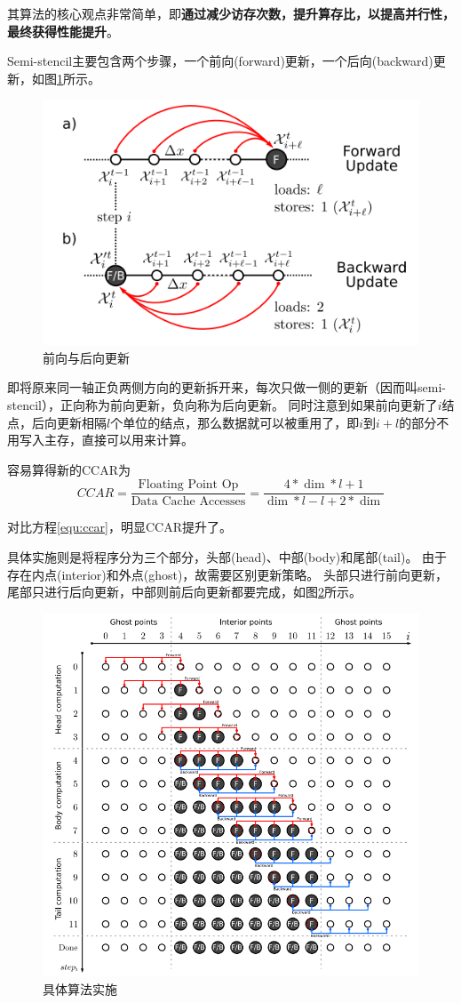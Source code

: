 \documentclass[reportComp,bib]{thesis}
\begin{document}
其算法的核心观点非常简单，即\textbf{通过减少访存次数，提升算存比，以提高并行性，最终获得性能提升}。

Semi-stencil主要包含两个步骤，一个前向(forward)更新，一个后向(backward)更新，如图\ref{fig:forward-backward}所示。
\begin{figure}[H]
\centering
\includegraphics[width=0.5\linewidth]{fig/forward-backward.PNG}
\caption{前向与后向更新}
\label{fig:forward-backward}
\end{figure}

即将原来同一轴正负两侧方向的更新拆开来，每次只做一侧的更新（因而叫semi-stencil），正向称为前向更新，负向称为后向更新。
同时注意到如果前向更新了$i$结点，后向更新相隔$l$个单位的结点，那么数据就可以被重用了，即$i$到$i+l$的部分不用写入主存，直接可以用来计算。

容易算得新的CCAR为
\begin{equation}
CCAR=\frac{\text{Floating Point Op}}{\text{Data Cache Accesses}}=\frac{4*\dim*l+1}{\dim*l-l+2*\dim}
\end{equation}

对比方程\ref{equ:ccar}，明显CCAR提升了。

具体实施则是将程序分为三个部分，头部(head)、中部(body)和尾部(tail)。
由于存在内点(interior)和外点(ghost)，故需要区别更新策略。
头部只进行前向更新，尾部只进行后向更新，中部则前后向更新都要完成，如图\ref{fig:algorithm}所示。
\begin{figure}[H]
\centering
\includegraphics[width=0.5\linewidth]{fig/algorithm.PNG}
\caption{具体算法实施}
\label{fig:algorithm}
\end{figure}
\end{document}

